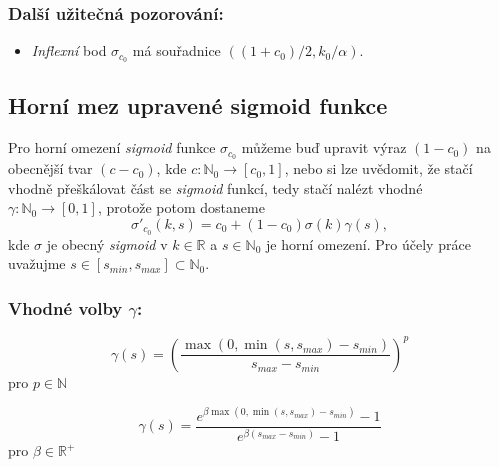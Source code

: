 \documentclass[12pt,a4paper]{report}
\begin{document}
\medbreak

\subsubsection{Další užitečná pozorování:}
\begin{itemize}
    \item \textit{Inflexní} bod $\sigma_{c_0}$ má souřadnice $((1+c_0)/2, k_0/\alpha)$.
\end{itemize}


\subsection{Horní mez upravené sigmoid funkce}
\label{sec:ShiftedSigmoidUpper}



Pro horní omezení \textit{sigmoid} funkce $\sigma_{c_0}$ můžeme buď upravit výraz $(1-c_0)$
na obecnější tvar $(c-c_0)$, kde $c: \mathbb{N}_0 \rightarrow [c_0, 1]$,
nebo si lze uvědomit, že stačí vhodně přeškálovat část se \textit{sigmoid} funkcí,
tedy stačí nalézt vhodné $\gamma: \mathbb{N}_0 \rightarrow [0, 1]$,
protože potom dostaneme
\begin{equation}
    \sigma'_{c_0}(k, s) = c_0 + (1-c_0)\sigma(k)\gamma(s),
\end{equation}
kde $\sigma$ je obecný \textit{sigmoid} v $k \in \mathbb{R}$ a $s \in \mathbb{N}_0$ je horní omezení.
Pro účely práce uvažujme $s \in [s_{min}, s_{max}] \subset \mathbb{N}_0$.


\subsubsection{Vhodné volby $\gamma$:}
\begin{equation}
    \gamma(s) = \left(\frac{\max\left(0,\min\left(s,s_{max}\right)-s_{min}\right)} {s_{max}-s_{min}}\right)^p
\end{equation}
pro $p\in \mathbb{N}$

\begin{equation}
    \gamma(s) = \frac{ e^{ \beta\max\left(0,\min\left(s,s_{max}\right)-s_{min}\right)} - 1 }{e^{ \beta\left( s_{max}-s_{min} \right)} - 1}
\end{equation}
pro $\beta \in \mathbb{R^+}$
\end{document}
